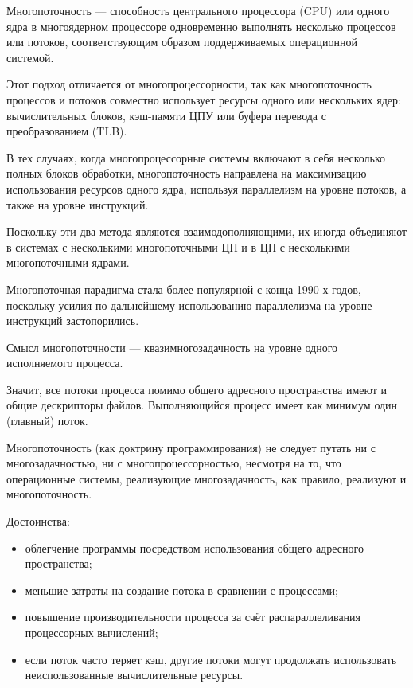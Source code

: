 \Introduction    
    Многопоточность — способность центрального процессора (CPU) или одного ядра в многоядерном процессоре одновременно выполнять несколько процессов или потоков, соответствующим образом поддерживаемых операционной системой.

    Этот подход отличается от многопроцессорности, так как многопоточность процессов и потоков совместно использует ресурсы одного или нескольких ядер: вычислительных блоков, кэш-памяти ЦПУ или буфера перевода с преобразованием (TLB).
    
    
    В тех случаях, когда многопроцессорные системы включают в себя несколько полных блоков обработки, многопоточность направлена на максимизацию использования ресурсов одного ядра, используя параллелизм на уровне потоков, а также на уровне инструкций.
    
    Поскольку эти два метода являются взаимодополняющими, их иногда объединяют в системах с несколькими многопоточными ЦП и в ЦП с несколькими многопоточными ядрами.
    
    
    Многопоточная парадигма стала более популярной с конца 1990-х годов, поскольку усилия по дальнейшему использованию параллелизма на уровне инструкций застопорились.
    
    Смысл многопоточности — квазимногозадачность на уровне одного исполняемого процесса.
    
    Значит, все потоки процесса помимо общего адресного пространства имеют и общие дескрипторы файлов. Выполняющийся процесс имеет как минимум один (главный) поток.
    
    
    Многопоточность (как доктрину программирования) не следует путать ни с многозадачностью, ни с многопроцессорностью, несмотря на то, что операционные системы, реализующие многозадачность, как правило, реализуют и многопоточность.
    
    
    Достоинства:
    
    \begin{itemize}
    
    	\item облегчение программы посредством использования общего адресного пространства;
    
    	\item меньшие затраты на создание потока в сравнении с процессами;
    
    	\item повышение производительности процесса за счёт распараллеливания процессорных вычислений;
    
    	\item если поток часто теряет кэш, другие потоки могут продолжать использовать неиспользованные вычислительные ресурсы.
    
    \end{itemize}
    
